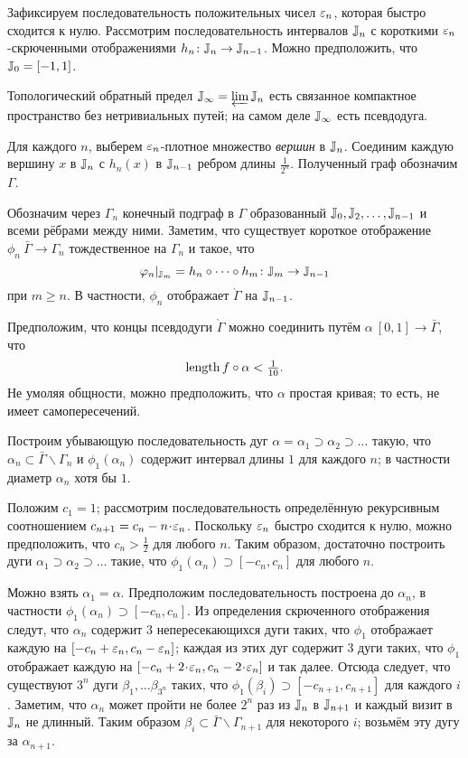 \documentclass[oneside,a4paper]{article}
\begin{document}
Зафиксируем последовательность положительных чисел $\varepsilon_n$, которая быстро  сходится к нулю.
Рассмотрим последовательность интервалов $\mathbb{J}_n$ с короткими $\varepsilon_n$-скрюченными отображениями $h_n\colon\mathbb{J}_{n}\to \mathbb{J}_{n-1}$.
Можно предположить, что $\mathbb{J}_0=[-1,1]$.

Топологический обратный предел $\mathbb{J}_\infty=\varprojlim \mathbb{J}_n$ есть связанное компактное пространство без нетривиальных путей; на самом деле $\mathbb{J}_\infty$ есть псевдодуга.

Для каждого $n$, выберем $\varepsilon_n$-плотное множество \emph{вершин} в $\mathbb{J}_n$.
Соединим каждую вершину $x$ в $\mathbb{J}_n$ с $h_n(x)$ в $\mathbb{J}_{n-1}$ ребром длины $\tfrac1{2^n}$.
Полученный граф обозначим $\Gamma$.

Обозначим через $\Gamma_n$ конечный подграф в $\Gamma$ образованный $\mathbb{J}_0,\mathbb{J}_2,\dots,\mathbb{J}_{n-1}$ и всеми рёбрами между ними.
Заметим, что существует короткое отображение $\phi_n\:\bar\Gamma\to\Gamma_{n}$ тождественное на $\Gamma_{n}$ и такое, что
\[\varphi_n|_{\mathbb{J}_m}=h_n\circ\dots\circ h_{m}\colon\mathbb{J}_m\to\mathbb{J}_{n-1}\] 
при $m\ge n$.
В частности, $\phi_n$ отображает $\grave\Gamma$ на $\mathbb{J}_{n-1}$.

Предположим, что концы псевдодуги $\grave\Gamma$ можно соединить путём $\alpha\:[0,1]\to\bar\Gamma$, что
\[\mathop{\rm length}\nolimits f\circ\alpha<\tfrac1{10}.\]
Не умоляя общности, можно предположить, что $\alpha$ простая кривая; то есть, не имеет самопересечений.

Построим убывающую последовательность дуг $\alpha=\alpha_1\supset \alpha_2\supset \dots$ такую, что $\alpha_n\subset \bar\Gamma\backslash\Gamma_n$ и $\phi_1(\alpha_n)$ содержит интервал длины $1$ для каждого $n$;
в частности диаметр $\alpha_n$ хотя бы $1$.

Положим $c_1=1$; 
рассмотрим последовательность определённую рекурсивным соотношением $c_{n+1}=c_n-n\cdot \eps_n$.
Поскольку $\varepsilon_n$ быстро сходится к нулю, можно предположить, что $c_n>\tfrac12$ для любого $n$.
Таким образом, достаточно построить дуги $\alpha_1\supset \alpha_2\supset \dots$ такие, что $\phi_1(\alpha_n)\supset [-c_n,c_n]$ для любого $n$.

Можно взять $\alpha_1=\alpha$.
Предположим последовательность построена до $\alpha_n$, в частности $\phi_1(\alpha_n)\supset [-c_n,c_n]$.
Из определения скрюченного отображения следут, что
$\alpha_n$ содержит $3$ непересекающихся дуги таких, что $\phi_1$ отображает каждую на $[-c_n+\varepsilon_n,c_n-\varepsilon_n]$;
каждая из этих дуг содержит $3$ дуги таких, что $\phi_1$ отображает каждую на  $[-c_n+2\cdot\eps_n,c_n-2\cdot \eps_n]$ и так далее.
Отсюда следует, что существуют $3^n$ дуги $\beta_1,\dots \beta_{3^n}$ таких, что $\phi_1(\beta_i)\supset [-c_{n+1},c_{n+1}]$ для каждого $i$.
Заметим, что $\alpha_n$ может пройти не более $2^n$ раз из $\mathbb{J}_n$ в $\mathbb{J}_{n+1}$
и каждый визит в $\mathbb{J}_n$ не длинный.
Таким образом $\beta_i\subset \bar\Gamma\backslash\Gamma_{n+1}$ для некоторого $i$; возьмём эту дугу за $\alpha_{n+1}$.
\end{document}
